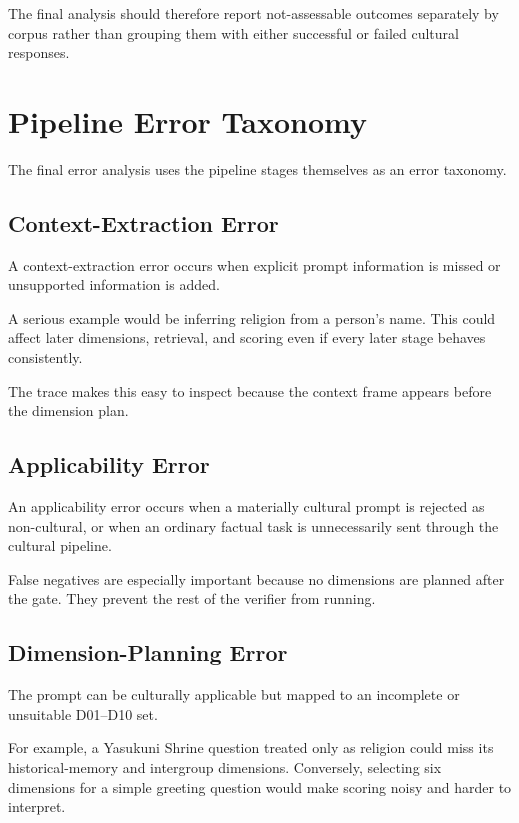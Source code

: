 The final analysis should therefore report not-assessable outcomes separately by corpus rather than grouping them with either successful or failed cultural responses.


\section{Pipeline Error Taxonomy}

The final error analysis uses the pipeline stages themselves as an error taxonomy.

\subsection{Context-Extraction Error}

A context-extraction error occurs when explicit prompt information is missed or unsupported information is added.

A serious example would be inferring religion from a person's name. This could affect later dimensions, retrieval, and scoring even if every later stage behaves consistently.

The trace makes this easy to inspect because the context frame appears before the dimension plan.

\subsection{Applicability Error}

An applicability error occurs when a materially cultural prompt is rejected as non-cultural, or when an ordinary factual task is unnecessarily sent through the cultural pipeline.

False negatives are especially important because no dimensions are planned after the gate. They prevent the rest of the verifier from running.

\subsection{Dimension-Planning Error}

The prompt can be culturally applicable but mapped to an incomplete or unsuitable D01--D10 set.

For example, a Yasukuni Shrine question treated only as religion could miss its historical-memory and intergroup dimensions. Conversely, selecting six dimensions for a simple greeting question would make scoring noisy and harder to interpret.

